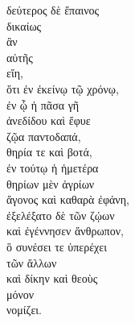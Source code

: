 {\large
\noindent δεύτερος δὲ ἔπαινος \\
\tabto{2em} δικαίως \\
\tabto{2em} ἂν \\
αὐτῆς \\
\tabto{2em} εἴη, \\
\tabto{4em} ὅτι ἐν ἐκείνῳ τῷ χρόνῳ, \\
\tabto{4em} ἐν ᾧ ἡ πᾶσα γῆ \\
\tabto{6em} ἀνεδίδου καὶ ἔφυε \\
\tabto{6em} ζῷα παντοδαπά, \\
\tabto{8em} θηρία τε καὶ βοτά, \\
\tabto{4em} ἐν τούτῳ ἡ ἡμετέρα \\
\tabto{6em} θηρίων μὲν ἀγρίων \\
\tabto{4em} ἄγονος καὶ καθαρὰ ἐφάνη, \\
\tabto{6em} ἐξελέξατο δὲ τῶν ζῴων \\
\tabto{6em} καὶ ἐγέννησεν ἄνθρωπον, \\
\tabto{8em} ὃ συνέσει τε ὑπερέχει \\
\tabto{10em} τῶν ἄλλων \\
\tabto{8em} καὶ δίκην καὶ θεοὺς \\
\tabto{8em} μόνον \\
\tabto{8em} νομίζει.\\

}


